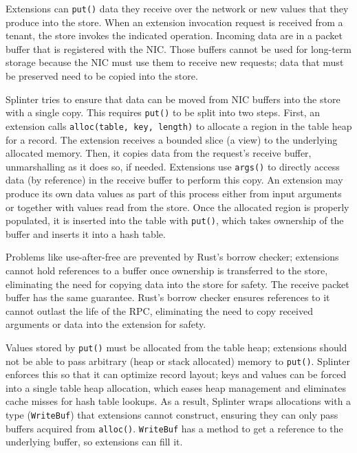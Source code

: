 Extensions can \texttt{put()} data they receive over the network
  or new values that they produce into the store.
When an extension invocation request is received from a tenant, the store invokes the indicated operation.
Incoming data are in a packet buffer that is registered with the NIC.
Those buffers cannot be used for long-term storage
  because the NIC must use them to receive new requests;
data that must be preserved need to be copied into the store.

Splinter tries to ensure that data can be moved from NIC buffers into the
    store with a single copy.
This requires \texttt{put()} to be split into two steps.
First, an extension calls \texttt{alloc(table, key, length)} to allocate a region in
  the table heap for a record.
The extension receives a bounded slice (a view) to the underlying allocated
  memory.
Then, it copies data from the request's receive buffer, unmarshalling
    as it does so, if needed.
Extensions use \texttt{args()} to directly access data (by
  reference) in the receive buffer to perform this copy.
An extension may produce its own data values as part of this process
    either from input arguments or together with values read from the store.
Once the allocated region is properly populated, it is inserted into the
  table with \texttt{put()},
which takes ownership of the buffer and inserts it into a hash table.

Problems like use-after-free are prevented by Rust's borrow checker;
extensions cannot hold references to a buffer once ownership is
  transferred to the store, eliminating the need for copying data into the
  store for safety.
The receive packet buffer has the same guarantee.
Rust's borrow checker ensures references to it cannot outlast
  the life of the RPC, eliminating the need to copy
  received arguments or data into the extension for safety.

Values stored by \texttt{put()} must be allocated from the table heap;
  extensions should not be able to pass arbitrary (heap or stack allocated)
  memory to \texttt{put()}.
Splinter enforces this so that it can optimize record layout;
keys and values can be forced into a single table heap allocation, which
  eases heap management and eliminates cache misses for hash table lookups.
As a result, Splinter wraps allocations
  with a type (\texttt{WriteBuf}) that extensions cannot construct,
  ensuring they can
  only pass buffers acquired from \texttt{alloc()}.
\texttt{WriteBuf} has a method to get a reference to the
  underlying buffer, so extensions can fill it.

